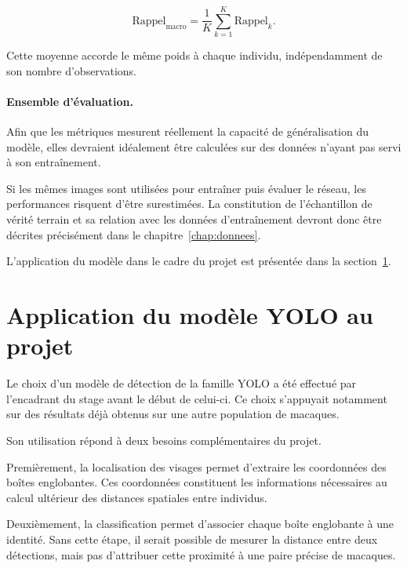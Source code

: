 \documentclass[11pt,a4paper]{report}
\begin{document}
\begin{equation}
    \text{Rappel}_{\mathrm{macro}}
    =
    \frac{1}{K}
    \sum_{k=1}^{K}
    \text{Rappel}_k.
\end{equation}

Cette moyenne accorde le même poids à chaque individu, indépendamment de son
nombre d'observations.

\paragraph{Ensemble d'évaluation.}

Afin que les métriques mesurent réellement la capacité de généralisation du
modèle, elles devraient idéalement être calculées sur des données n'ayant pas
servi à son entraînement.

Si les mêmes images sont utilisées pour entraîner puis évaluer le réseau, les
performances risquent d'être surestimées. La constitution de l'échantillon de
vérité terrain et sa relation avec les données d'entraînement devront donc être
décrites précisément dans le chapitre~\ref{chap:donnees}.

L'application du modèle dans le cadre du projet est présentée dans
 la section~\ref{sec:eval-application}.

\section{Application du modèle YOLO au projet}
\label{sec:eval-application}

Le choix d'un modèle de détection de la famille YOLO a été effectué par
l'encadrant du stage avant le début de celui-ci. Ce choix s'appuyait notamment
sur des résultats déjà obtenus sur une autre population de macaques.

Son utilisation répond à deux besoins complémentaires du projet.

Premièrement, la localisation des visages permet d'extraire les coordonnées des
boîtes englobantes. Ces coordonnées constituent les informations nécessaires
au calcul ultérieur des distances spatiales entre individus.

Deuxièmement, la classification permet d'associer chaque boîte englobante à une
identité. Sans cette étape, il serait possible de mesurer la distance entre
deux détections, mais pas d'attribuer cette proximité à une paire précise de
macaques.
\end{document}
